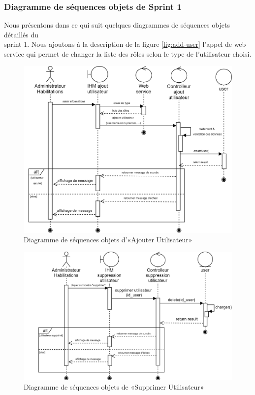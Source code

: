 \subsubsection{Diagramme de séquences objets de Sprint 1}
Nous présentons dans ce qui suit quelques diagrammes de séquences objets détaillés du \\sprint 1.
\newpage
{} 
Nous ajoutons à la description de la figure \ref{fig:add-user} l'appel de web service qui permet de changer la liste des rôles selon le type de l'utilisateur choisi.
\begin{figure}[H]
	\centering
	\includegraphics[width=0.75\linewidth]{img/conception/sequences/add-user-obj}
	\caption[Diagramme de séquences objets d’«Ajouter Utilisateur»]{Diagramme de séquences objets d’«Ajouter Utilisateur»}
	\label{fig:add-user-obj}
\end{figure}

\begin{figure}[H]
	\centering
	\includegraphics[width=0.75\linewidth]{img/conception/sequences/delete-obj}
	\caption[Diagramme de séquences objets de «Supprimer Utilisateur»]{Diagramme de séquences objets de «Supprimer Utilisateur»}
	\label{fig:delete-obj}
\end{figure}

